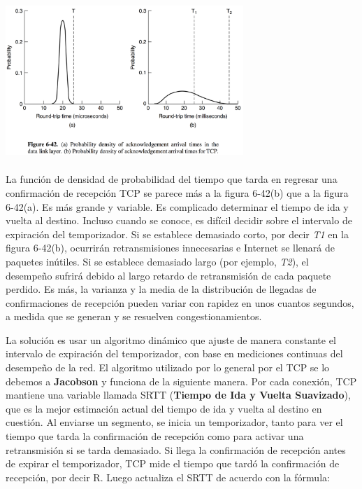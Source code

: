 \documentclass[10pt,a4paper]{report}
\begin{document}
	\begin{center}
		\includegraphics[width=9cm, height=6cm]{./imagenes/temporalizador.png}
	\end{center}

	\par La función de densidad de probabilidad del tiempo que tarda en regresar una confirmación de recepción TCP se parece más a la figura 6-42(b) que a la figura 6-42(a). Es más grande y variable. Es complicado determinar el tiempo de ida y vuelta al destino. Incluso cuando se conoce, es difícil decidir sobre el intervalo de expiración del temporizador. Si se establece demasiado corto, por decir \textit{T1} en la figura 6-42(b), ocurrirán retransmisiones innecesarias e Internet se llenará de paquetes inútiles. Si se establece demasiado largo (por ejemplo, \textit{T2}), el desempeño sufrirá debido al largo retardo de retransmisión de cada paquete perdido. Es más, la varianza y la media de la distribución de llegadas de confirmaciones de recepción pueden variar con rapidez en unos cuantos segundos, a medida que se generan y se resuelven congestionamientos.

	\par La solución es usar un algoritmo dinámico que ajuste de manera constante el intervalo de expiración del temporizador, con base en mediciones continuas del desempeño de la red. El algoritmo utilizado por lo general por el TCP se lo debemos a \textbf{Jacobson} y funciona de la siguiente manera. Por cada conexión, TCP mantiene una variable llamada SRTT (\textbf{Tiempo de Ida y Vuelta Suavizado}), que es la mejor estimación actual del tiempo de ida y vuelta al destino en cuestión. Al enviarse un segmento, se inicia un temporizador, tanto para ver el tiempo que tarda la confirmación de recepción como para activar una retransmisión si se tarda demasiado. Si llega la confirmación de recepción antes de expirar el temporizador, TCP mide el tiempo que tardó la confirmación de recepción, por decir R. Luego actualiza el SRTT de acuerdo con la fórmula:
	
\end{document}
